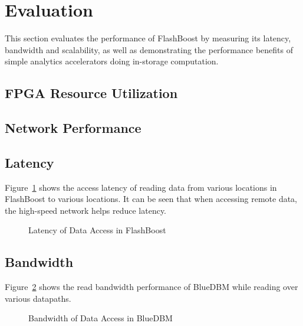 \section{Evaluation}

This section evaluates the performance of FlashBoost by measuring its latency,
bandwidth and scalability, as well as demonstrating the performance benefits of
simple analytics accelerators doing in-storage computation.

\subsection{FPGA Resource Utilization}

\subsection{Network Performance}

\subsection{Latency}

Figure~\ref{fig:result_latency} shows the access latency of reading data from
various locations in FlashBoost to various locations. It can be seen that when
accessing remote data, the high-speed network helps reduce latency.

\begin{figure}[h]
	\begin{center}
	\caption{Latency of Data Access in FlashBoost}
	\label{fig:result_latency}
	\end{center}
\end{figure}
%
%


\subsection{Bandwidth}

Figure~\ref{fig:result_bandwidth} shows the read bandwidth performance of
BlueDBM while reading over various datapaths. 

\begin{figure}[h]
	\begin{center}
	\caption{Bandwidth of Data Access in BlueDBM}
	\label{fig:result_bandwidth}
	\end{center}
\end{figure}

